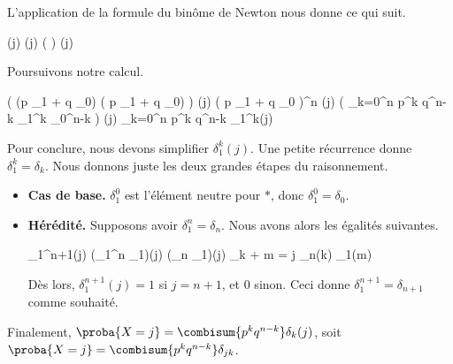 L'application de la formule du binôme de Newton nous donne ce qui suit.

\begin{stepcalc}[style=sar]
\explnext{}
	\lawvar(j)
\explnext{}
	\lawvar[X_1 + \cdots + X_n](j)
	( \lawvar[X_1] \ast \cdots \ast \lawvar[X_n] ) (j)
\end{stepcalc}
	
Poursuivons notre calcul.

\begin{stepcalc}[style=sar]
\explnext{}
	\big( (p \delta_{1} + q \delta_{0}) \ast \cdots \ast ( p \delta_{1} + q \delta_{0}) \big) (j)
	( p \delta_{1} + q \delta_{0} )^n (j)
\explnext{}
	\big( \dsum_{k=0}^n \combi[n][k] p^k q^{n-k} \delta_{1}^k \ast \delta_{0}^{n-k} \big) (j)
	\dsum_{k=0}^n \combi[n][k] p^k q^{n-k} \delta_{1}^k(j)
\end{stepcalc}


Pour conclure, nous devons simplifier $\delta_{1}^k(j)$. Une petite récurrence donne $\delta_{1}^k = \delta_k$. Nous donnons juste les deux grandes étapes du raisonnement.
%
\begin{itemize}
	\item \textbf{Cas de base.}
	$\delta_{1}^0$ est l'élément neutre pour $\ast$, donc $\delta_{1}^0 = \delta_0$.


	\item \textbf{Hérédité.}
	Supposons avoir $\delta_{1}^n = \delta_n$. Nous avons alors les égalités suivantes.

	\begin{stepcalc}[style=sar]
		\kern-10pt\delta_{1}^{n+1}(j)
	\explnext{}
		(\delta_{1}^{n} \ast \delta_{1})(j)
	\explnext{}
		(\delta_{n} \ast \delta_{1})(j)
	\explnext{}
		\dsum_{k + m = j} \delta_{n}(k) \delta_{1}(m)
	\end{stepcalc}
	
	\noindent
	Dès lors,
	$\delta_{1}^{n+1}(j) = 1$ si $j=n+1$, et $0$ sinon.
	Ceci donne $\delta_{1}^{n+1} = \delta_{n+1}$ comme souhaité.
\end{itemize}


Finalement,
$\proba{X = j} = \combisum{p^k q^{n-k}} \delta_{k}(j)$,
soit
$\proba{X = j} = \combisum{p^k q^{n-k}} \delta_{jk}$.